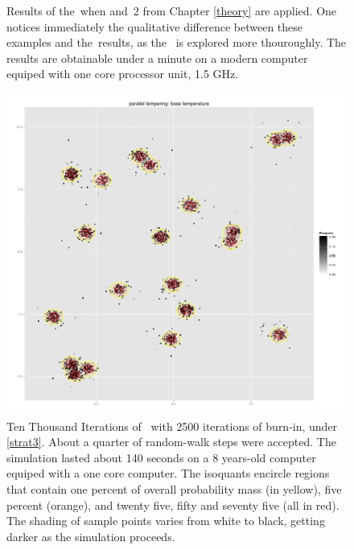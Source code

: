 \documentclass{book}
\begin{document}
\begin{figure}
\begin{minipage}[b]{.5\linewidth}
	\label{plotStrategy2}
	\end{minipage}
	\caption[\PT\, with \strat\,1 and \strat\,2]{Results of the \PT\,when  and \strat\,2 from Chapter \ref{theory} are applied. One notices immediately the qualitative difference between these examples and the \MH\,results, as the \sspace\, is explored more thouroughly. The results are obtainable under a minute on a modern computer equiped with one core processor unit, 1.5 GHz.}\label{PTshort}
\end{figure}

\begin{figure}[ht]
	\centering 
	\includegraphics[width=\textwidth,keepaspectratio]{./img/PT10000Motivation.png}
	\caption[Ten Thousand Iterations of \PT]{Ten Thousand Iterations of \PT\, with 2500 iterations of burn-in, under \ref{strat3}. About a quarter of random-walk steps were accepted. The simulation lasted about 140 seconds on a 8 years-old computer equiped with a one core computer. The isoquants encircle regions that contain one percent of overall probability mass (in yellow), five percent (orange), and twenty five, fifty and seventy five (all in red). The shading of sample points varies from white to black, getting darker as the simulation proceeds.}\label{PTlong}
\end{figure}
\end{document}
